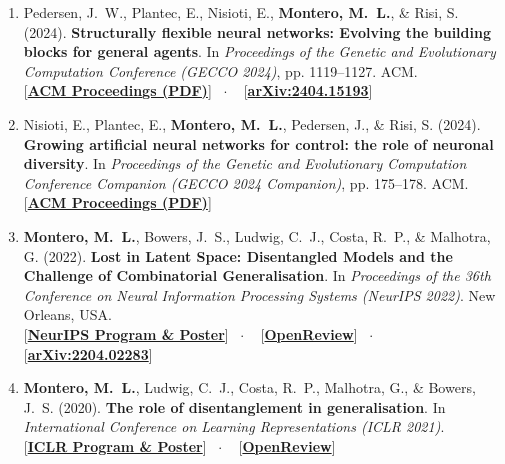 \documentclass[10pt,a4paper]{article}
\newcommand{\linkbadge}[2]{%
  \textcolor{tagcolor}{[}\href{#2}{\textbf{#1}}\textcolor{tagcolor}{]}%
}
\begin{document}
\begin{enumerate}[leftmargin=1.6em, itemsep=0.45em]
    \item Pedersen, J.~W., Plantec, E., Nisioti, E., \textbf{Montero, M.~L.}, \& Risi, S. (2024). \textbf{Structurally flexible neural networks: Evolving the building blocks for general agents}. In \textit{Proceedings of the Genetic and Evolutionary Computation Conference (GECCO 2024)}, pp. 1119--1127. ACM. \\
    \linkbadge{ACM Proceedings (PDF)}{https://dl.acm.org/doi/pdf/10.1145/3638529.3654113} \ $\cdot$ \
    \linkbadge{arXiv:2404.15193}{https://arxiv.org/abs/2404.15193}

    \item Nisioti, E., Plantec, E., \textbf{Montero, M.~L.}, Pedersen, J., \& Risi, S. (2024). \textbf{Growing artificial neural networks for control: the role of neuronal diversity}. In \textit{Proceedings of the Genetic and Evolutionary Computation Conference Companion (GECCO 2024 Companion)}, pp. 175--178. ACM. \\
    \linkbadge{ACM Proceedings (PDF)}{https://dl.acm.org/doi/pdf/10.1145/3638530.3654356}

    \item \textbf{Montero, M.~L.}, Bowers, J.~S., Ludwig, C.~J., Costa, R.~P., \& Malhotra, G. (2022). \textbf{Lost in Latent Space: Disentangled Models and the Challenge of Combinatorial Generalisation}. In \textit{Proceedings of the 36th Conference on Neural Information Processing Systems (NeurIPS 2022)}. New Orleans, USA. \\
    \linkbadge{NeurIPS Program \& Poster}{https://neurips.cc/virtual/2022/poster/52961} \ $\cdot$ \
    \linkbadge{OpenReview}{https://openreview.net/pdf?id=7yUxTNWyQGf} \ $\cdot$ \
    \linkbadge{arXiv:2204.02283}{https://arxiv.org/abs/2204.02283}

    \item \textbf{Montero, M.~L.}, Ludwig, C.~J., Costa, R.~P., Malhotra, G., \& Bowers, J.~S. (2020). \textbf{The role of disentanglement in generalisation}. In \textit{International Conference on Learning Representations (ICLR 2021)}. \\
    \linkbadge{ICLR Program \& Poster}{https://iclr.cc/virtual/2021/poster/3173} \ $\cdot$ \
    \linkbadge{OpenReview}{https://openreview.net/pdf?id=qbH974jKUVy}
\end{enumerate}
\end{document}
